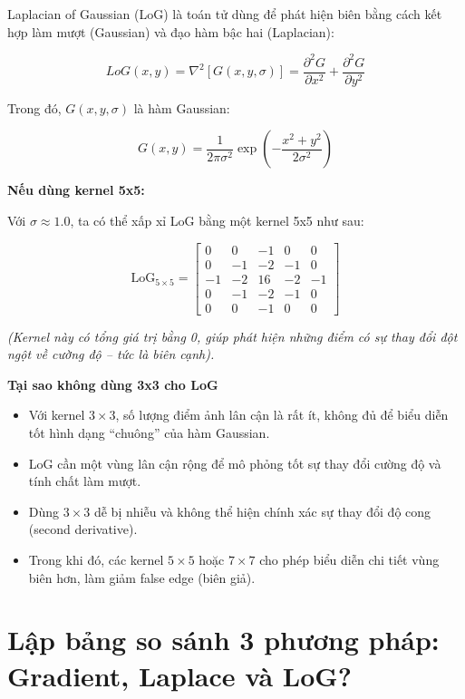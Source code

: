 \documentclass[12pt]{article}
\begin{document}
	Laplacian of Gaussian (LoG) là toán tử dùng để phát hiện biên bằng cách kết hợp làm mượt (Gaussian) và đạo hàm bậc hai (Laplacian):
	
	\[
	LoG(x, y) = \nabla^2 \left[ G(x, y, \sigma) \right] = \frac{\partial^2 G}{\partial x^2} + \frac{\partial^2 G}{\partial y^2}
	\]
	
	Trong đó, $G(x, y, \sigma)$ là hàm Gaussian:
	
	\[
	G(x, y) = \frac{1}{2\pi \sigma^2} \exp\left( -\frac{x^2 + y^2}{2\sigma^2} \right)
	\]
	
	\textbf{Nếu dùng kernel 5x5:}
	
	Với $\sigma \approx 1.0$, ta có thể xấp xỉ LoG bằng một kernel 5x5 như sau:
	
	\[
	\text{LoG}_{5 \times 5} =
	\begin{bmatrix}
	0 & 0 & -1 & 0 & 0 \\
	0 & -1 & -2 & -1 & 0 \\
	-1 & -2 & 16 & -2 & -1 \\
	0 & -1 & -2 & -1 & 0 \\
	0 & 0 & -1 & 0 & 0
	\end{bmatrix}
	\]
	
	\textit{(Kernel này có tổng giá trị bằng 0, giúp phát hiện những điểm có sự thay đổi đột ngột về cường độ – tức là biên cạnh).}
	
	\textbf{Tại sao không dùng 3x3 cho LoG}
	
	\begin{itemize}
	\item Với kernel $3 \times 3$, số lượng điểm ảnh lân cận là rất ít, không đủ để biểu diễn tốt hình dạng “chuông” của hàm Gaussian.
	\item LoG cần một vùng lân cận rộng để mô phỏng tốt sự thay đổi cường độ và tính chất làm mượt.
	\item Dùng $3 \times 3$ dễ bị nhiễu và không thể hiện chính xác sự thay đổi độ cong (second derivative).
	\item Trong khi đó, các kernel $5 \times 5$ hoặc $7 \times 7$ cho phép biểu diễn chi tiết vùng biên hơn, làm giảm false edge (biên giả).
	\end{itemize}
	
	\section{Lập bảng so sánh 3 phương pháp: Gradient, Laplace và LoG?}
	
\end{document}
